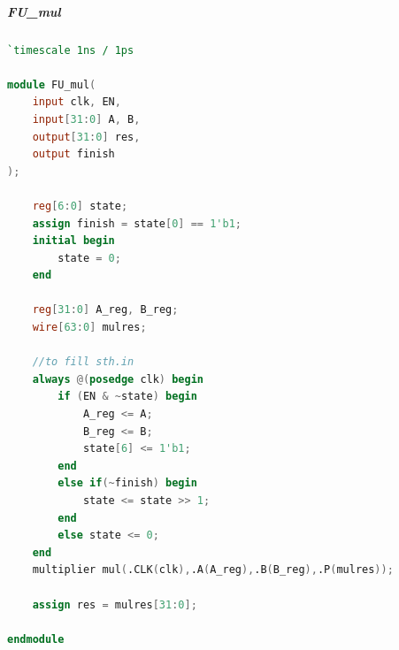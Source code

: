 \subparagraph{FU\_mul}

\begin{lstlisting}[language = {verilog}]
	`timescale 1ns / 1ps

module FU_mul(
    input clk, EN,
    input[31:0] A, B,
    output[31:0] res,
    output finish
);

    reg[6:0] state;
    assign finish = state[0] == 1'b1;
    initial begin
        state = 0;
    end

    reg[31:0] A_reg, B_reg;
    wire[63:0] mulres;
    
    //to fill sth.in
    always @(posedge clk) begin
        if (EN & ~state) begin
            A_reg <= A;
            B_reg <= B;
            state[6] <= 1'b1;
        end
        else if(~finish) begin
            state <= state >> 1;
        end
        else state <= 0;
    end
    multiplier mul(.CLK(clk),.A(A_reg),.B(B_reg),.P(mulres));

    assign res = mulres[31:0];

endmodule
\end{lstlisting}